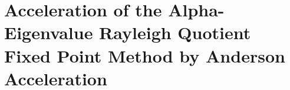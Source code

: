 \chapter{Acceleration of the Alpha-Eigenvalue Rayleigh Quotient Fixed Point Method by Anderson Acceleration}
\label{sec:AndAcc}